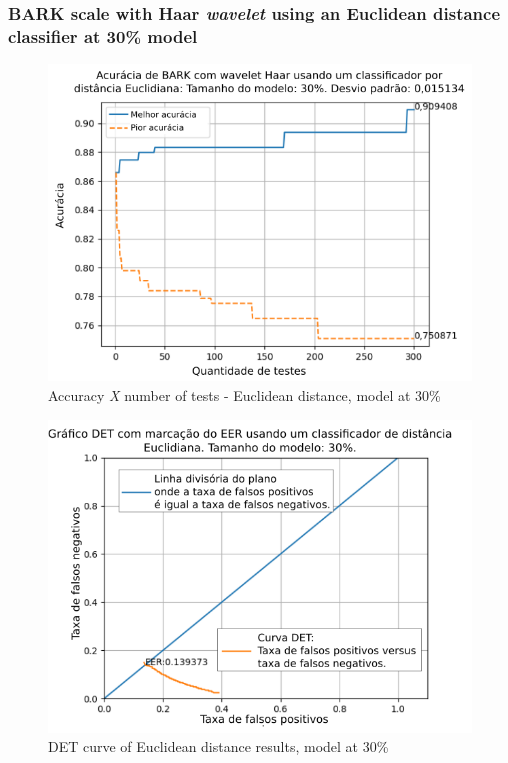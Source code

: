		\subsubsection{BARK scale with Haar \textit{wavelet} using an Euclidean distance classifier at 30\% model}
		
			
			
			\begin{figure}[ht]
				\centering
				\includegraphics[width=\linewidth]{images/results/confusionMatrices/classifier_Euclidian_30}
				\caption{Accuracy \textit{X} number of tests - Euclidean distance, model at 30\%}
				\label{fig:classifiereuclidian30}
			\end{figure}
			
			\begin{figure}[ht]
				\centering
				\includegraphics[width=.9\linewidth]{images/results/det/DET_for_classifier_Euclidian_30}
				\caption{DET curve of Euclidean distance results, model at 30\%}
				\label{fig:detforclassifiereuclidian30}
			\end{figure}
		
